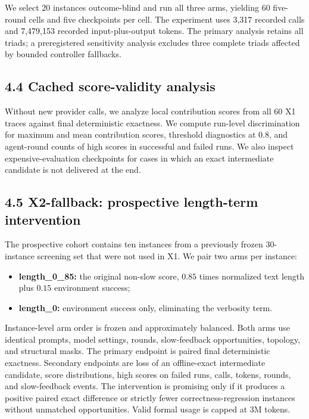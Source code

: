 \documentclass{article}
\begin{document}
We select 20 instances outcome-blind and run all three arms, yielding 60 five-round cells and five checkpoints per cell. The experiment uses 3,317 recorded calls and 7,479,153 recorded input-plus-output tokens. The primary analysis retains all triads; a preregistered sensitivity analysis excludes three complete triads affected by bounded controller fallbacks.

\subsection{4.4 Cached score-validity analysis}

Without new provider calls, we analyze local contribution scores from all 60 X1 traces against final deterministic exactness. We compute run-level discrimination for maximum and mean contribution scores, threshold diagnostics at 0.8, and agent-round counts of high scores in successful and failed runs. We also inspect expensive-evaluation checkpoints for cases in which an exact intermediate candidate is not delivered at the end.

\subsection{4.5 X2-fallback: prospective length-term intervention}

The prospective cohort contains ten instances from a previously frozen 30-instance screening set that were not used in X1. We pair two arms per instance:

\begin{itemize}
  \item \textbf{length\_0\_85:} the original non-slow score, \(0.85\) times normalized text length plus \(0.15\) environment success;
  \item \textbf{length\_0:} environment success only, eliminating the verbosity term.
\end{itemize}

Instance-level arm order is frozen and approximately balanced. Both arms use identical prompts, model settings, rounds, slow-feedback opportunities, topology, and structural masks. The primary endpoint is paired final deterministic exactness. Secondary endpoints are loss of an offline-exact intermediate candidate, score distributions, high scores on failed runs, calls, tokens, rounds, and slow-feedback events. The intervention is promising only if it produces a positive paired exact difference or strictly fewer correctness-regression instances without unmatched opportunities. Valid formal usage is capped at 3M tokens.
\end{document}
